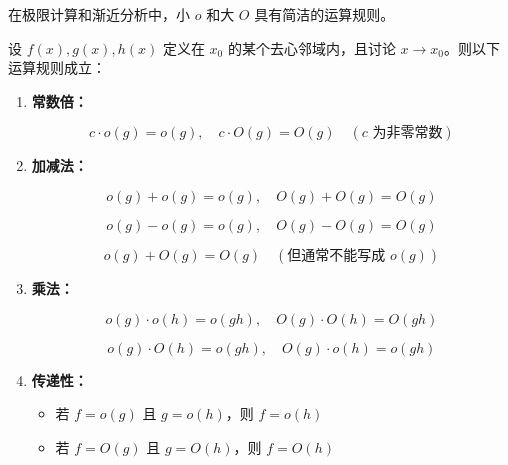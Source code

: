 \documentclass[fontset=fandol]{ctexart}
\begin{document}
在极限计算和渐近分析中，小 \(o\) 和大 \(O\) 具有简洁的运算规则。



\begin{theorem}[小 \(o\) 与大 \(O\) 的运算性质]

设 \(f(x),g(x),h(x)\) 定义在 \(x_0\) 的某个去心邻域内，且讨论 \(x\to x_0\)。则以下运算规则成立：



\begin{enumerate}

\item \textbf{常数倍：}

   \[

   c \cdot o(g) = o(g),\quad c \cdot O(g) = O(g) \quad (c \text{ 为非零常数})

   \]



\item \textbf{加减法：}

   \[

   o(g) + o(g) = o(g),\quad O(g) + O(g) = O(g)

   \]

   \[

   o(g) - o(g) = o(g),\quad O(g) - O(g) = O(g)

   \]

   \[

   o(g) + O(g) = O(g) \quad (\text{但通常不能写成 } o(g))

   \]



\item \textbf{乘法：}

   \[

   o(g) \cdot o(h) = o(gh),\quad O(g) \cdot O(h) = O(gh)

   \]

   \[

   o(g) \cdot O(h) = o(gh),\quad O(g) \cdot o(h) = o(gh)

   \]



\item \textbf{传递性：}

   \begin{itemize}

   \item 若 \(f = o(g)\) 且 \(g = o(h)\)，则 \(f = o(h)\)

   \item 若 \(f = O(g)\) 且 \(g = O(h)\)，则 \(f = O(h)\)


\end{itemize}
\end{enumerate}
\end{theorem}
\end{document}
